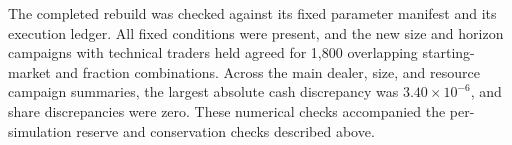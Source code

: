 
The completed rebuild was checked against its fixed parameter manifest and
its execution ledger. All fixed conditions were present, and the new size
and horizon campaigns with technical traders held agreed for 1,800 overlapping starting-market
and fraction combinations. Across the main dealer, size, and resource
campaign summaries, the largest absolute cash discrepancy was $3.40\times10^{-6}$,
and share discrepancies were zero. These numerical checks accompanied
the per-simulation reserve and conservation checks described above.
